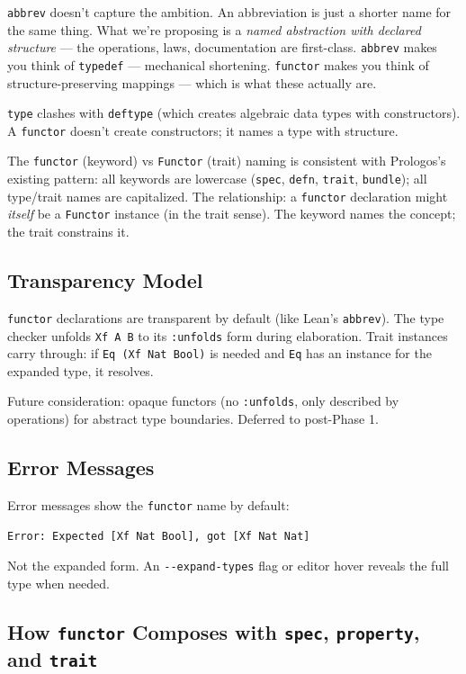 \documentclass[11pt]{article}
\begin{document}
\texttt{abbrev} doesn't capture the ambition. An abbreviation is just a shorter name
for the same thing. What we're proposing is a \emph{named abstraction with declared
structure} --- the operations, laws, documentation are first-class. \texttt{abbrev}
makes you think of \texttt{typedef} --- mechanical shortening. \texttt{functor} makes you
think of structure-preserving mappings --- which is what these actually are.

\texttt{type} clashes with \texttt{deftype} (which creates algebraic data types with
constructors). A \texttt{functor} doesn't create constructors; it names a type with
structure.

The \texttt{functor} (keyword) vs \texttt{Functor} (trait) naming is consistent with Prologos's
existing pattern: all keywords are lowercase (\texttt{spec}, \texttt{defn}, \texttt{trait}, \texttt{bundle});
all type/trait names are capitalized. The relationship: a \texttt{functor} declaration
might \emph{itself} be a \texttt{Functor} instance (in the trait sense). The keyword names
the concept; the trait constrains it.
\subsection{Transparency Model}
\label{sec:org33b0c02}

\texttt{functor} declarations are transparent by default (like Lean's \texttt{abbrev}). The
type checker unfolds \texttt{Xf A B} to its \texttt{:unfolds} form during elaboration. Trait
instances carry through: if \texttt{Eq (Xf Nat Bool)} is needed and \texttt{Eq} has an
instance for the expanded type, it resolves.

Future consideration: opaque functors (no \texttt{:unfolds}, only described by
operations) for abstract type boundaries. Deferred to post-Phase 1.
\subsection{Error Messages}
\label{sec:orgcad4477}

Error messages show the \texttt{functor} name by default:

\begin{verbatim}
Error: Expected [Xf Nat Bool], got [Xf Nat Nat]
\end{verbatim}

Not the expanded form. An \texttt{-{}-{}expand-types} flag or editor hover reveals the
full type when needed.
\subsection{How \texttt{functor} Composes with \texttt{spec}, \texttt{property}, and \texttt{trait}}
\label{sec:org8323b77}
\end{document}
